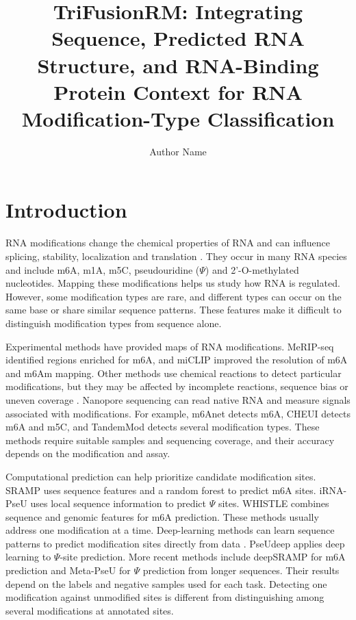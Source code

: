 \documentclass[unnumsec,webpdf,contemporary,large]{oup-authoring-template}
\title[TriFusionRM]{TriFusionRM: Integrating Sequence, Predicted RNA Structure, and RNA-Binding Protein Context for RNA Modification-Type Classification}
\author[1]{Author Name}
\begin{document}
\maketitle
\section{Introduction}

RNA modifications change the chemical properties of RNA and can influence splicing, stability, localization and translation \citep{ref1}. They occur in many RNA species and include m6A, m1A, m5C, pseudouridine ($\Psi$) and 2'-O-methylated nucleotides. Mapping these modifications helps us study how RNA is regulated. However, some modification types are rare, and different types can occur on the same base or share similar sequence patterns. These features make it difficult to distinguish modification types from sequence alone.

Experimental methods have provided maps of RNA modifications. MeRIP-seq \citep{ref2} identified regions enriched for m6A, and miCLIP \citep{ref3} improved the resolution of m6A and m6Am mapping. Other methods use chemical reactions to detect particular modifications, but they may be affected by incomplete reactions, sequence bias or uneven coverage \citep{ref4}. Nanopore sequencing can read native RNA and measure signals associated with modifications. For example, m6Anet \citep{ref5} detects m6A, CHEUI \citep{ref6} detects m6A and m5C, and TandemMod \citep{ref7} detects several modification types. These methods require suitable samples and sequencing coverage, and their accuracy depends on the modification and assay.

Computational prediction can help prioritize candidate modification sites. SRAMP \citep{ref8} uses sequence features and a random forest to predict m6A sites. iRNA-PseU \citep{ref9} uses local sequence information to predict $\Psi$ sites. WHISTLE \citep{ref10} combines sequence and genomic features for m6A prediction. These methods usually address one modification at a time. Deep-learning methods can learn sequence patterns to predict modification sites directly from data \citep{ref11}. PseUdeep \citep{ref12} applies deep learning to $\Psi$-site prediction. More recent methods include deepSRAMP \citep{ref13} for m6A prediction and Meta-PseU \citep{ref14} for $\Psi$ prediction from longer sequences. Their results depend on the labels and negative samples used for each task. Detecting one modification against unmodified sites is different from distinguishing among several modifications at annotated sites.
\end{document}
